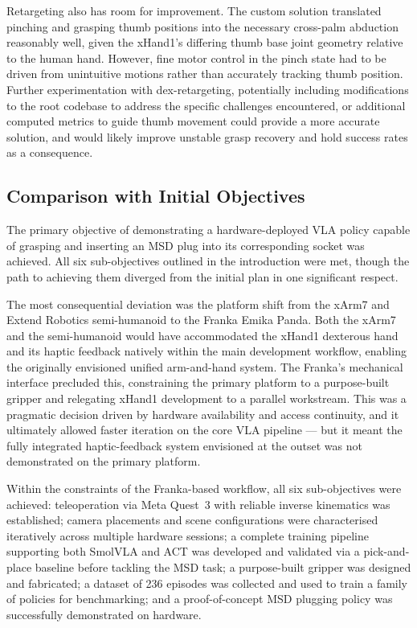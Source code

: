 \documentclass[conference]{IEEEtran}
\begin{document}
Retargeting also has room for improvement. The custom solution translated pinching and grasping thumb positions into the necessary cross-palm abduction reasonably well, given the xHand1's differing thumb base joint geometry relative to the human hand. However, fine motor control in the pinch state had to be driven from unintuitive motions rather than accurately tracking thumb position. Further experimentation with dex-retargeting, potentially including modifications to the root codebase to address the specific challenges encountered, or additional computed metrics to guide thumb movement could provide a more accurate solution, and would likely improve unstable grasp recovery and hold success rates as a consequence.

\subsection{Comparison with Initial Objectives}

The primary objective of demonstrating a hardware-deployed VLA policy capable of grasping and inserting an MSD plug into its corresponding socket was achieved. All six sub-objectives outlined in the introduction were met, though the path to achieving them diverged from the initial plan in one significant respect.

The most consequential deviation was the platform shift from the xArm7 and Extend Robotics semi-humanoid to the Franka Emika Panda. Both the xArm7 and the semi-humanoid would have accommodated the xHand1 dexterous hand and its haptic feedback natively within the main development workflow, enabling the originally envisioned unified arm-and-hand system. The Franka's mechanical interface precluded this, constraining the primary platform to a purpose-built gripper and relegating xHand1 development to a parallel workstream. This was a pragmatic decision driven by hardware availability and access continuity, and it ultimately allowed faster iteration on the core VLA pipeline --- but it meant the fully integrated haptic-feedback system envisioned at the outset was not demonstrated on the primary platform.

Within the constraints of the Franka-based workflow, all six sub-objectives were achieved:  teleoperation via Meta Quest~3 with reliable inverse kinematics was established; camera placements and scene configurations were characterised iteratively across multiple hardware sessions; a complete training pipeline supporting both SmolVLA and ACT was developed and validated via a pick-and-place baseline before tackling the MSD task; a purpose-built gripper was designed and fabricated; a dataset of 236 episodes was collected and used to train a family of policies for benchmarking; and a proof-of-concept MSD plugging policy was successfully demonstrated on hardware.
\end{document}
